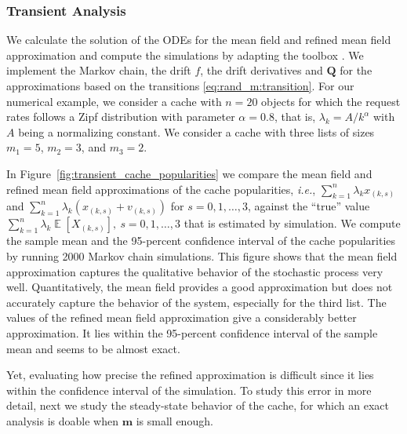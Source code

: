 \documentclass[acmsmall]{acmart}
\newcommand\bm{\mathbf{m}}
\newcommand\bQ{\mathbf{Q}}
\DeclareMathOperator{\E}{\mathbb{E}} %
\begin{document}

\subsubsection{Transient Analysis}

We calculate the solution of the ODEs for the mean field and refined mean field approximation and compute the simulations by adapting the toolbox \cite{allmeier2021rmftool}. We implement the Markov chain, the drift $f$, the drift derivatives and $\bQ$ for the approximations based on the transitions \eqref{eq:rand_m:transition}. For our numerical example, we consider a cache with $n=20$ objects for which the request rates follows a Zipf distribution with parameter $\alpha=0.8$, that is, $\lambda_k = A / k^{\alpha}$ with $A$ being a normalizing constant. We consider a cache with three lists of sizes $m_1 = 5$, $m_2 = 3$, and $m_3 = 2$. 

In Figure~\ref{fig:transient_cache_popularities} we compare the mean field and refined mean field approximations of the cache popularities, \emph{i.e.}, $\sum_{k=1}^n \lambda_k x_{(k,s)}$ and $\sum_{k=1}^n \lambda_k (x_{(k,s)} + v_{(k,s)})$ for $s=0,1,\ldots, 3$, against the ``true'' value $\sum_{k=1}^n \lambda_k \E[X_{(k,s)}], \ s=0,1,\ldots, 3$ that is estimated by simulation. We compute the sample mean and the 95-percent confidence interval of the cache popularities by running 2000 Markov chain simulations. This figure shows that the mean field approximation captures the qualitative behavior of the stochastic process very well. Quantitatively, the mean field provides a good approximation but does not accurately capture the behavior of the system, especially for the third list. The values of the refined mean field approximation give a considerably better approximation. It lies within the 95-percent confidence interval of the sample mean and seems to be almost exact. 

Yet, evaluating how precise the refined approximation is difficult since it lies within the confidence interval of the simulation. To study this error in more detail, next we study the steady-state behavior of the cache, for which an exact analysis is doable when $\bm$ is small enough.
\end{document}
